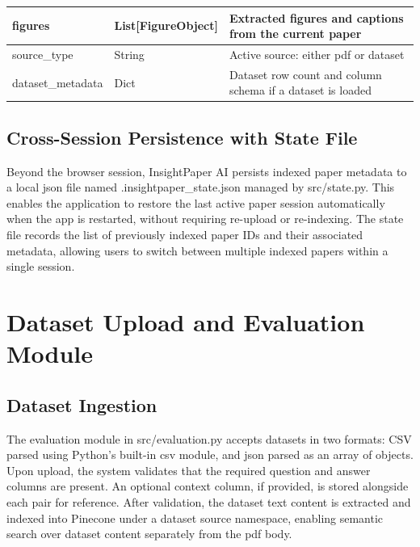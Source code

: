 \begin{table}[H]
\begin{tabular}{|p{3.5cm}|p{2.5cm}|p{7cm}|}
\hline

figures & List[FigureObject] & Extracted figures and captions from the current paper \\

\hline

source\_type & String & Active source: either pdf or dataset \\

\hline

dataset\_metadata & Dict & Dataset row count and column schema if a dataset is loaded \\

\hline

\end{tabular}

\end{table}

\subsection{Cross-Session Persistence with State File}

Beyond the browser session, InsightPaper AI persists indexed paper metadata to a local \gls{json} file named .insightpaper\_state.json managed by src/state.py. This enables the application to restore the last active paper session automatically when the app is restarted, without requiring re-upload or re-indexing. The state file records the list of previously indexed paper IDs and their associated metadata, allowing users to switch between multiple indexed papers within a single session.

\section{Dataset Upload and Evaluation Module}

\subsection{Dataset Ingestion}

The evaluation module in src/evaluation.py accepts datasets in two formats: CSV parsed using Python's built-in csv module, and \gls{json} parsed as an array of objects. Upon upload, the system validates that the required question and answer columns are present. An optional context column, if provided, is stored alongside each pair for reference.
\newline \newline After validation, the dataset text content is extracted and indexed into Pinecone under a dataset source namespace, enabling semantic search over dataset content separately from the \gls{pdf} body.

